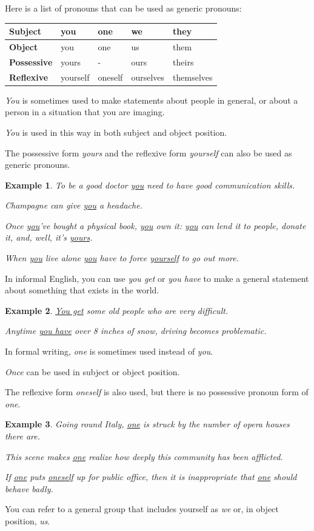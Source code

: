 \documentclass[oneside]{book}
\numberwithin{equation}{section}
\newtheorem{example}{Example}[section]
\begin{document}
%
Here is a list of pronouns that can be used as generic pronouns:
\begin{table}[H]
    \centering
    \begin{tabular}{|l|l|l|l|l|}
        \hline
        \textbf{Subject} & you & one & we & they \\
        \hline
        \textbf{Object} & you & one & us & them \\
        \hline
        \textbf{Possessive} & yours & - & ours & theirs \\
        \hline
        \textbf{Reflexive} & yourself & oneself & ourselves & themselves \\
        \hline
    \end{tabular}
\end{table}
%
\noindent{} \textit{You} is sometimes used to make statements about people in general, or about a person in a situation that you are imaging.

\textit{You} is used in this way in both subject and object position.

The possessive form \textit{yours} and the reflexive form \textit{yourself} can also be used as generic pronouns.
\begin{example}
    To be a good doctor \underline{you} need to have good communication skills.
    
    Champagne can give \underline{you} a headache.
    
    Once \underline{you}'ve bought a physical book, \underline{you} own it: \underline{you} can lend it to people, donate it, and, well, it's \underline{yours}.
    
    When \underline{you} live alone \underline{you} have to force \underline{yourself} to go out more.
\end{example}
In informal English, you can use \textit{you get} or \textit{you have} to make a general statement about something that exists in the world.
\begin{example}
    \underline{You get} some old people who are very difficult.
    
    Anytime \underline{you have} over 8 inches of snow, driving becomes problematic.
\end{example}
%
\noindent{} In formal writing, \textit{one} is sometimes used instead of \textit{you}.

\textit{Once} can be used in subject or object position.

The reflexive form \textit{oneself} is also used, but there is no possessive pronoun form of \textit{one}.
\begin{example}
    Going round Italy, \underline{one} is struck by the number of opera houses there are.
    
    This scene makes \underline{one} realize how deeply this community has been afflicted.
    
    If \underline{one} puts \underline{oneself} up for public office, then it is inappropriate that \underline{one} should behave badly.
\end{example}
%
\noindent{} You can refer to a general group that includes yourself as \textit{we} or, in object position, \textit{us}.
\end{document}
